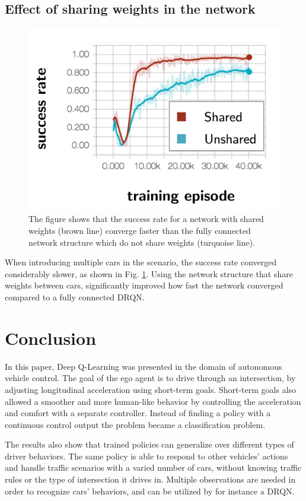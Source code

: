 \subsection{Effect of sharing weights in the network}
\begin{figure}[!ht]
	\centering
	\includegraphics[width=0.8\columnwidth]{figures/results_shared.png}
	\caption{The figure shows that the success rate for a network with shared weights (brown line) converge faster than the fully connected network structure which do not share weights (turquoise line).}
	\label{fig:results_shared}
\end{figure}
When introducing multiple cars in the scenario, the success rate converged considerably slower, as shown in Fig. \ref{fig:results_shared}. Using the network structure that share weights between cars, significantly improved how fast the network converged compared to a fully connected DRQN. 

\section{Conclusion}
\label{sec:conclusion}
In this paper, Deep Q-Learning was presented in the domain of autonomous vehicle control. The goal of the ego agent is to drive through an intersection, by adjusting longitudinal acceleration using short-term goals. Short-term goals also allowed a smoother and more human-like behavior by controlling the acceleration and comfort with a separate controller. Instead of finding a policy with a continuous control output the problem became a classification problem. 

The results also show that trained policies can generalize over different types of driver behaviors. The same policy is able to respond to other vehicles' actions and handle traffic scenarios with a varied number of cars, without knowing traffic rules or the type of intersection it drives in. Multiple observations are needed in order to recognize cars' behaviors, and can be utilized by for instance a DRQN. 

